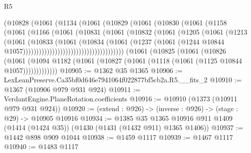\begin{lexlean}{R5}
\begin{coremodule}
                            (@10828
                              (@1061
                                (@1134
                                  (@1061
                                    (@10829
                                      (@1061
                                        (@10830
                                          (@1061
                                            (@1158
                                              (@1061
                                                (@1166
                                                  (@1061
                                                    (@10831
                                                      (@1061
                                                        (@10832
                                                          (@1061
                                                            (@1205
                                                              (@1061
                                                                (@1213
                                                                  (@1061
                                                                    (@10833
                                                                      (@1061
                                                                        (@10834
                                                                          (@1061
                                                                            (@1237
                                                                              (@1061
                                                                                (@1244
                                                                                  @10844
                                                                                  @1057))))))))))))))))))))))))))))))))))))))
      (@1061
        (@10825
          (@1061
            (@10826
              (@1061
                (@1094 @1182 (@1061 (@10827 (@1061 (@1118 (@1061 (@1125 @10844 @1057)))))))))))))
@10905 := @1362 @35 @1365
@10906 := LexLeanPreserve.Ca35bf0d646e7941064f022877bf5cb2a.R5.__fits_2
@10910 := @1367 (@10906 @979 @931 @924)
@10911 := VerdantEngine.PlaneRotation.coefficients
@10916 := @10910 (@1373 (@10911 @979 @931 @924))
@10920 := (extend : @926) -> (inverse : @926) -> (stage : @29) -> @10905 @10916
@10934 := @1385
    @35
    @1365
    @10916
    @911
    @1409
    (@1414 (@1424 @35))
    (@1430 (@1431 (@1432 @911) @1365 @1406))
@10937 := @1442 @898 @909 @1044
@10938 := @1459 @1117
@10939 := @1467 @1117
@10940 := @1483 @1117

\end{coremodule}
\end{lexlean}
